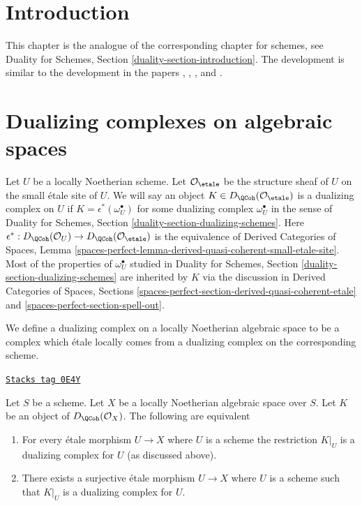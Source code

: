 \section{Introduction}
\label{spaces-duality-section-introduction}
This chapter is the analogue of the corresponding chapter for
schemes, see Duality for Schemes, Section \ref{duality-section-introduction}.
The development is similar to the development in the papers
\cite{Neeman-Grothendieck}, \cite{LN},
\cite{Lipman-notes}, and \cite{Neeman-improvement}.

\section{Dualizing complexes on algebraic spaces}
\label{spaces-duality-section-dualizing-spaces}
Let $U$ be a locally Noetherian scheme. Let $\mathcal{O}_\etale$
be the structure sheaf of $U$ on the small \'etale site of $U$.
We will say an object $K \in D_\QCoh(\mathcal{O}_\etale)$ is
a dualizing complex on $U$ if $K = \epsilon^*(\omega_U^\bullet)$
for some dualizing complex $\omega_U^\bullet$ in the sense of
Duality for Schemes, Section \ref{duality-section-dualizing-schemes}.
Here $\epsilon^* : D_\QCoh(\mathcal{O}_U) \to D_\QCoh(\mathcal{O}_\etale)$
is the equivalence of Derived Categories of Spaces, Lemma
\ref{spaces-perfect-lemma-derived-quasi-coherent-small-etale-site}.
Most of the properties of $\omega_U^\bullet$ studied in
Duality for Schemes, Section \ref{duality-section-dualizing-schemes}
are inherited by $K$ via the discussion in
Derived Categories of Spaces, Sections
\ref{spaces-perfect-section-derived-quasi-coherent-etale} and
\ref{spaces-perfect-section-spell-out}.

\medskip\noindent
We define a dualizing complex on a locally Noetherian algebraic space
to be a complex which \'etale locally comes from a dualizing
complex on the corresponding scheme.

\begin{lemma}
\label{spaces-duality-lemma-equivalent-definitions}
\href{https://stacks.math.columbia.edu/tag/0E4Y}{\texttt{Stacks tag 0E4Y}}

Let $S$ be a scheme. Let $X$ be a locally Noetherian algebraic space over $S$.
Let $K$ be an object of $D_\QCoh(\mathcal{O}_X)$. The following are equivalent
\begin{enumerate}
\item For every \'etale morphism $U \to X$ where $U$ is a scheme
the restriction $K|_U$ is a dualizing complex for $U$ (as discussed above).
\item There exists a surjective \'etale morphism $U \to X$ where $U$ is a
scheme such that $K|_U$ is a dualizing complex for $U$.
\end{enumerate}
\end{lemma}

